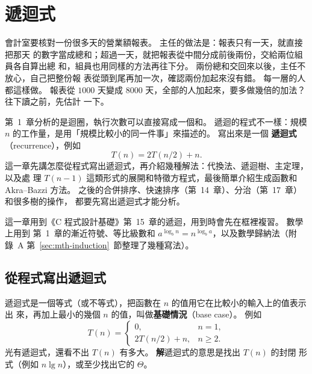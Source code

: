 \chapter{遞迴式}
\label{ch:recurrences}


會計室要核對一份很多天的營業額報表。 主任的做法是：報表只有一天，就直接把那天
的數字當成總和；超過一天，就把報表從中間分成前後兩份，交給兩位組員各自算出總
和，組員也用同樣的方法再往下分。 兩份總和交回來以後，主任不放心，自己把整份報
表從頭到尾再加一次，確認兩份加起來沒有錯。 每一層的人都這樣做。 報表從
$1000$ 天變成 $8000$ 天，全部的人加起來，要多做幾倍的加法？ 往下讀之前，先估計
一下。

第~1~章分析的是迴圈，執行次數可以直接寫成一個和。 遞迴的程式不一樣：規模
$n$ 的工作量，是用「規模比較小的同一件事」來描述的。 寫出來是一個
\textbf{遞迴式}（recurrence），例如
\[
T(n) = 2T(n/2) + n .
\]
這一章先講怎麼從程式寫出遞迴式，再介紹幾種解法：代換法、遞迴樹、主定理，以及處
理 $T(n-1)$ 這類形式的展開和特徵方程式，最後簡單介紹生成函數和 Akra--Bazzi
方法。 之後的合併排序、快速排序（第~14~章）、分治（第~17~章）和很多樹的操作，
都要先寫出遞迴式才能分析。

這一章用到《C 程式設計基礎》第~15~章的遞迴，用到時會先在框裡複習。 數學上用到
第~1~章的漸近符號、等比級數和 $a^{\log_b n} = n^{\log_b a}$，以及數學歸納法（附錄~A
第~\ref{sec:mth-induction}~節整理了幾種寫法）。

\section{從程式寫出遞迴式}
\label{sec:rec-write}

遞迴式是一個等式（或不等式），把函數在 $n$ 的值用它在比較小的輸入上的值表示出
來，再加上最小的幾個 $n$ 的值，叫做\textbf{基礎情況}（base case）。 例如
\[
T(n) = \begin{cases} 0, & n = 1, \\ 2T(n/2) + n, & n \ge 2. \end{cases}
\]
光有遞迴式，還看不出 $T(n)$ 有多大。 \textbf{解}遞迴式的意思是找出 $T(n)$ 的封閉
形式（例如 $n \lg n$），或至少找出它的 $\Theta$。

